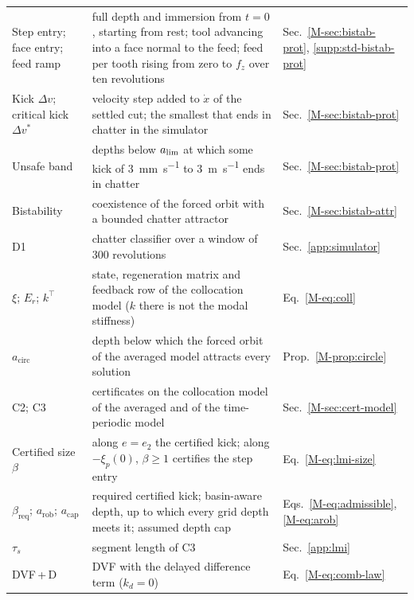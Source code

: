 \begin{table}[!htbp]
\begin{tabular}{@{}>{\raggedright\arraybackslash}p{}>{\raggedright\arraybackslash}p{}>{\raggedright\arraybackslash}p{}@{}}
    Step entry; face entry; feed ramp & full depth and immersion from $t=0$, starting from rest; tool advancing into a face normal to the feed; feed per tooth rising from zero to $f_z$ over ten revolutions & Sec.~\ref{M-sec:bistab-prot}, \ref{supp:std-bistab-prot}\\
    Kick $\Delta v$; critical kick $\Delta v^*$ & velocity step added to $\dot x$ of the settled cut; the smallest that ends in chatter in the simulator & Sec.~\ref{M-sec:bistab-prot}\\
    Unsafe band & depths below $a_{\lim}$ at which some kick of \SI{3}{\milli\metre\per\second} to \SI{3}{\metre\per\second} ends in chatter & Sec.~\ref{M-sec:bistab-prot}\\
    Bistability & coexistence of the forced orbit with a bounded chatter attractor & Sec.~\ref{M-sec:bistab-attr}\\
    D1 & chatter classifier over a window of 300 revolutions & Sec.~\ref{app:simulator}\\
    $\xi$; $E_r$; $k^\top$ & state, regeneration matrix and feedback row of the collocation model ($k$ there is not the modal stiffness) & Eq.~\eqref{M-eq:coll}\\
    $a_{\mathrm{circ}}$ & depth below which the forced orbit of the averaged model attracts every solution & Prop.~\ref{M-prop:circle}\\
    C2; C3 & certificates on the collocation model of the averaged and of the time-periodic model & Sec.~\ref{M-sec:cert-model}\\
    Certified size $\beta$ & along $e=e_2$ the certified kick; along $-\xi_p(0)$, $\beta\ge1$ certifies the step entry & Eq.~\eqref{M-eq:lmi-size}\\
    $\beta_{\mathrm{req}}$; $a_{\mathrm{rob}}$; $a_{\mathrm{cap}}$ & required certified kick; basin-aware depth, up to which every grid depth meets it; assumed depth cap & Eqs.~\eqref{M-eq:admissible}, \eqref{M-eq:arob}\\
    $\tau_s$ & segment length of C3 & Sec.~\ref{app:lmi}\\
    DVF\,+\,D & DVF with the delayed difference term ($k_d=0$) & Eq.~\eqref{M-eq:comb-law}\\
    \bottomrule
  \end{tabular}
\end{table}

